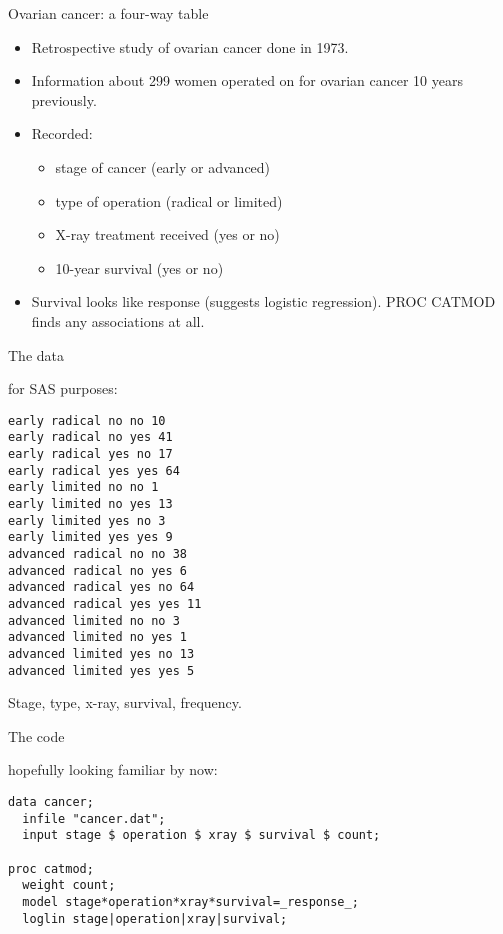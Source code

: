 \documentclass[pdf]{prosper}
\begin{document}
\begin{slide}{Ovarian cancer: a four-way table}

  \begin{itemize}
  \item Retrospective study of ovarian cancer done in 1973.
  \item Information about 299 women operated on for ovarian cancer 10 years previously.
  \item Recorded:
    \begin{itemize}
    \item stage of cancer (early or advanced)
    \item type of operation (radical or limited)
    \item X-ray treatment received (yes or no)
    \item 10-year survival (yes or no)
    \end{itemize}
  \item Survival looks like response (suggests logistic regression). PROC CATMOD finds any associations at all.
  \end{itemize}
  
\end{slide}

\begin{slide}{The data}

for SAS purposes:

{\scriptsize
\begin{verbatim}
early radical no no 10
early radical no yes 41
early radical yes no 17
early radical yes yes 64
early limited no no 1
early limited no yes 13
early limited yes no 3
early limited yes yes 9
advanced radical no no 38
advanced radical no yes 6
advanced radical yes no 64
advanced radical yes yes 11
advanced limited no no 3
advanced limited no yes 1
advanced limited yes no 13
advanced limited yes yes 5

\end{verbatim}
}

Stage, type, x-ray, survival, frequency.
  
\end{slide}

\begin{slide}{The code}

hopefully looking familiar by now:

\begin{verbatim}
data cancer;
  infile "cancer.dat";
  input stage $ operation $ xray $ survival $ count;

proc catmod;
  weight count;
  model stage*operation*xray*survival=_response_;
  loglin stage|operation|xray|survival;

\end{verbatim}
  
\end{slide}
\end{document}
